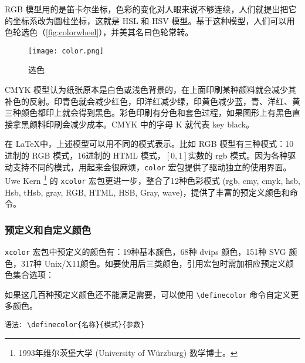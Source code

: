 RGB 模型用的是笛卡尔坐标，色彩的变化对人眼来说不够连续，人们就提出把它的坐标系改为圆柱坐标，这就是 HSL 和 HSV 模型。基于这种模型，人们可以用色轮选色（\autoref{fig:colorwheel}），并美其名曰色轮常转。

\begin{figure}[htbp]
\centering
\texttt{[image: color.png]}
\caption{选色}
\label{fig:colorwheel}
\end{figure}

CMYK 模型认为纸张原本是白色或浅色背景的，在上面印刷某种颜料就会减少其补色的反射。印青色就会减少红色，印洋红减少绿，印黄色减少蓝，青、洋红、黄三种颜色都印上就会得到黑色。彩色印刷有分色和套色过程，如果图形上有黑色直接拿黑颜料印刷会减少成本。CMYK 中的字母 K 就代表 key black。

在 \LaTeX 中，上述模型可以用不同的模式表示。比如 RGB 模型有三种模式：10进制的 RGB 模式，16进制的 HTML 模式，$[0,1]$实数的 rgb 模式。因为各种驱动支持不同的模式，用起来会很麻烦，\texttt{color} 宏包提供了驱动独立的使用界面。Uwe Kern\indexKern{} \footnote{1993年维尔茨堡大学 (University of Würzburg) 数学博士。} 的 \texttt{xcolor} 宏包更进一步，整合了12种色彩模式 (rgb, cmy, cmyk, hsb, Hsb, tHsb, gray, RGB, HTML, HSB, Gray, wave)，提供了丰富的预定义颜色和命令。

\subsubsection{预定义和自定义颜色}

\texttt{xcolor} 宏包中预定义的颜色有：19种基本颜色，68种 dvips 颜色，151种 SVG 颜色，317种 Unix/X11颜色。如要使用后三类颜色，引用宏包时需加相应预定义颜色集合选项：

\begin{Code}[]
\usepackage[dvipsnames]{xcolor}
\usepackage[svgnames]{xcolor}
\usepackage[x11names]{xcolor}
\end{Code}

如果这几百种预定义颜色还不能满足需要，可以使用 \verb|\definecolor| 命令自定义更多颜色。

\verb|语法: \definecolor{名称}{模式}{参数}|

\begin{example}[h]
\begin{Code}[]
\end{Code}
\caption{自定义颜色}
\label{exa:definecolor}
\end{example}

